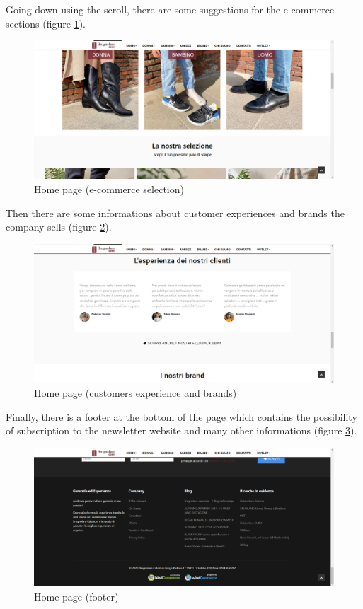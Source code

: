 \vspace*{\fill}
Going down using the scroll, there are some suggestions for the
e-commerce sections (figure \ref{home-page-scroll-1}).
\vspace*{\fill}
\vspace*{\fill}
\begin{figure}[!h] 
    \centering 
    \includegraphics[scale = 0.29]{images/hp_scroll1.png} 
    \caption{Home page (e-commerce selection)}
    \label{home-page-scroll-1}
\end{figure}
\vspace*{\fill}
\newpage
Then there are some informations about customer experiences and
brands the company sells (figure \ref{home-page-scroll-2}).
\begin{figure}[!h] 
    \centering 
    \includegraphics[scale = 0.29]{images/hp_scroll2.png} 
    \caption{Home page (customers experience and brands)}
    \label{home-page-scroll-2}
\end{figure}
\newline
Finally, there is a footer at the bottom of the page which contains
the possibility of subscription to the newsletter website and many other
informations (figure \ref{home-page-scroll-3}).
\begin{figure}[!h] 
    \centering 
    \includegraphics[scale = 0.29]{images/hp_scroll3.png} 
    \caption{Home page (footer)}
    \label{home-page-scroll-3}
\end{figure}
